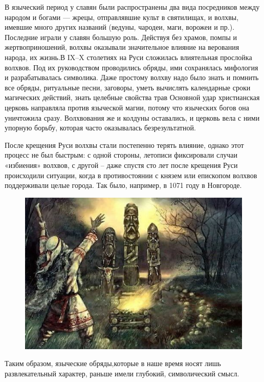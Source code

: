 \documentclass[a4paper, 12pt]{report}
\begin{document}
В языческий период у славян были распространены два вида посредников между народом и богами — жрецы, отправлявшие культ в святилищах, и волхвы, имевшие много других названий (ведуны, чародеи, маги, ворожеи и пр.). Последние играли у славян большую роль. Действуя без храмов, помпы и жертвоприношений, волхвы оказывали значительное влияние на верования народа, их жизнь.В IX–X столетиях на Руси сложилась влиятельная прослойка волхвов. Под их руководством проводились обряды, ими сохранялась мифология и разрабатывалась символика. Даже простому волхву надо было знать и помнить все обряды, ритуальные песни, заговоры, уметь вычислять календарные сроки магических действий, знать целебные свойства трав Основной удар христианская церковь направляла против языческой магии, потому что языческих богов она уничтожила сразу. Волхвования же и колдуны оставались, и церковь вела с ними упорную борьбу, которая часто оказывалась безрезультатной. 

После крещения Руси волхвы стали постепенно терять влияние, однако этот процесс не был быстрым: с одной стороны, летописи фиксировали случаи «избиения» волхвов, с другой – даже спустя сто лет после крещения Руси происходили ситуации, когда в противостоянии с князем или епископом волхвов поддерживали целые города. Так было, например, в 1071 году в Новгороде.

\begin{figure}[H]
\begin{center}
\includegraphics[scale = 0.5]{idol.eps}
\end{center}
\end{figure}

Таким образом, языческие обряды,которые в наше время носят лишь развлекательный характер, раньше имели глубокий, символический смысл.
\end{document}
